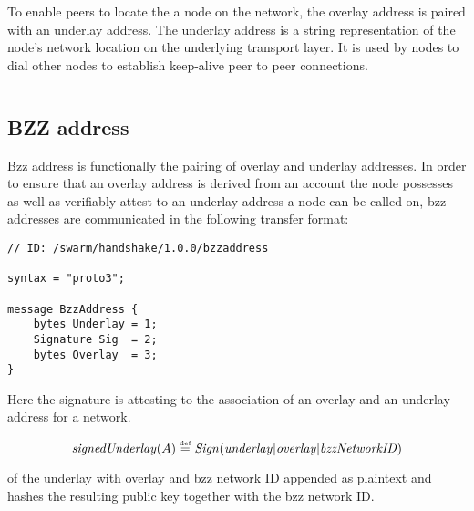 To enable peers to locate the a node on the network, the overlay address is paired with an underlay address. The underlay address is a string representation of the node's network location on the underlying transport layer. It is used by nodes to dial other nodes to establish keep-alive peer to peer connections. 

\begin{definition}\label{def:underlay}
\begin{lstlisting}[]

\end{lstlisting}
\end{definition}


\subsection{BZZ address \statusyellow}

Bzz address is functionally the pairing of overlay and underlay addresses. In order to ensure that an overlay address is derived from an account the node possesses as well as verifiably attest to an underlay address a node can be called on, bzz addresses are communicated in the following transfer format:

\begin{definition}\label{def:bzz-address}
\begin{lstlisting}[]
// ID: /swarm/handshake/1.0.0/bzzaddress

syntax = "proto3";

message BzzAddress {
    bytes Underlay = 1;
    Signature Sig  = 2;
    bytes Overlay  = 3; 
}
\end{lstlisting}
\end{definition}

Here the signature is attesting to the association of an overlay and an underlay address for a network. 

\begin{definition}\label{def:signed-underlay}
\begin{equation}
\mathit{signedUnderlay}(A) \overset{\textrm{\tiny def}}{=} \mathit{Sign}(\mathit{underlay}|
\mathit{overlay}|\mathit{bzzNetworkID})         
\end{equation}
\end{definition}

of the underlay with overlay and bzz network ID appended as plaintext and hashes the resulting public key together with the bzz network ID. 

